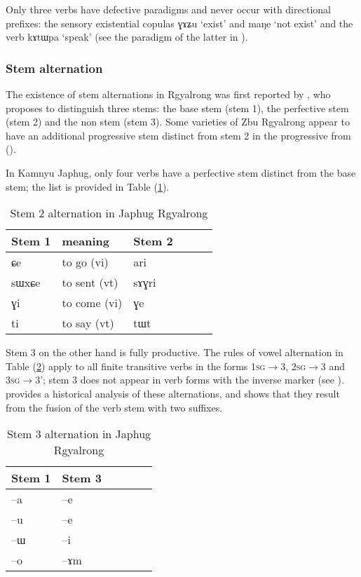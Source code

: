 \documentclass[oldfontcommands,oneside,a4paper,11pt]{article}
\newcommand{\ipa}[1]{{\phon \mbox{#1}}} %
\newcommand{\refb}[1]{(\ref{#1})}
\begin{document}
Only three verbs have defective paradigms and never occur with directional prefixes: the sensory existential copulas \ipa{ɣɤʑu} `exist' and \ipa{maŋe} `not exist' and the verb \ipa{kɤtɯpa} `speak' (see the paradigm of the latter in \citealt[1215]{jacques12incorp}).

\subsubsection{Stem alternation} \label{sec:stem}
The existence of stem alternations in Rgyalrong was first reported by \citet{jackson00puxi}, who proposes to distinguish three stems: the base stem (stem 1), the perfective stem (stem 2) and the non stem (stem 3). Some varieties of Zbu Rgyalrong appear to have an additional progressive stem distinct from stem 2 in the progressive from (\citealt[352]{jacques04these}).


In Kamnyu Japhug, only four verbs have a   perfective stem distinct from the base stem; the list is provided in Table \refb{tab:stem2}. 


 \begin{table} 
\caption{Stem 2 alternation in Japhug Rgyalrong} \label{tab:stem2} \centering
\begin{tabular}{llllll}
\toprule
Stem 1 & meaning &Stem 2 \\
\midrule
\ipa{ɕe}& to go (vi)&  \ipa{ari} \\
\ipa{sɯxɕe}& to sent (vt)  &\ipa{sɤɣri} \\
\ipa{ɣi}& to come (vi)  &\ipa{ɣe} \\
\ipa{ti}& to say (vt)  &\ipa{tɯt} \\
\bottomrule
\end{tabular}
\end{table}


Stem 3 on the other hand is fully productive. The rules of vowel alternation in Table \refb{tab:stem3} apply to all finite transitive verbs in the forms \textsc{1sg}$\rightarrow$3, \textsc{2sg}$\rightarrow$3 and \textsc{3sg}$\rightarrow$3'; stem 3 does not appear in verb forms with the inverse marker (see \citealt{gongxun14agreement}). \citet[351-7]{jacques04these} provides a historical analysis of these alternations, and shows that they result from the fusion of the verb stem with two suffixes. %

 \begin{table} 
\caption{Stem 3 alternation in Japhug Rgyalrong} \label{tab:stem3} \centering
\begin{tabular}{llllll}
\toprule
Stem 1 & Stem 3 \\
\midrule
\ipa{--a} & \ipa{--e} \\
\ipa{--u} & \ipa{--e} \\
\ipa{--ɯ} & \ipa{--i} \\
\ipa{--o} & \ipa{--ɤm} \\
\bottomrule
\end{tabular}
\end{table}
\end{document}

